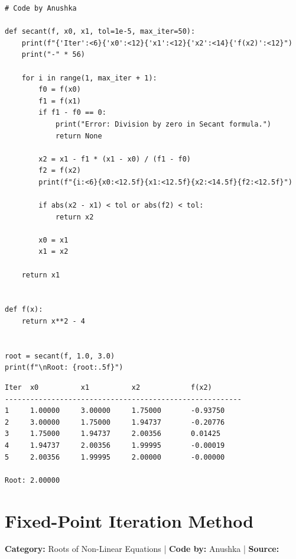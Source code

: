 \documentclass[10pt,a4paper]{report}
\begin{document}
\begin{tcolorbox}[colback=codebg,colframe=secondary,title=\textbf{Python Implementation (Step-by-Step Loops \& Pure Functions)},boxrule=1pt,arc=2mm]
\begin{lstlisting}[style=python_detailed]
# Code by Anushka

def secant(f, x0, x1, tol=1e-5, max_iter=50):
    print(f"{'Iter':<6}{'x0':<12}{'x1':<12}{'x2':<14}{'f(x2)':<12}")
    print("-" * 56)

    for i in range(1, max_iter + 1):
        f0 = f(x0)
        f1 = f(x1)
        if f1 - f0 == 0:
            print("Error: Division by zero in Secant formula.")
            return None

        x2 = x1 - f1 * (x1 - x0) / (f1 - f0)
        f2 = f(x2)
        print(f"{i:<6}{x0:<12.5f}{x1:<12.5f}{x2:<14.5f}{f2:<12.5f}")

        if abs(x2 - x1) < tol or abs(f2) < tol:
            return x2

        x0 = x1
        x1 = x2

    return x1


def f(x):
    return x**2 - 4


root = secant(f, 1.0, 3.0)
print(f"\nRoot: {root:.5f}")

\end{lstlisting}
\end{tcolorbox}

\begin{tcolorbox}[colback=termbg,colframe=primary,title=\textbf{Program Execution Output \& Convergence Table},boxrule=1pt,arc=2mm]
\begin{lstlisting}[style=terminal_output]
Iter  x0          x1          x2            f(x2)       
--------------------------------------------------------
1     1.00000     3.00000     1.75000       -0.93750    
2     3.00000     1.75000     1.94737       -0.20776    
3     1.75000     1.94737     2.00356       0.01425     
4     1.94737     2.00356     1.99995       -0.00019    
5     2.00356     1.99995     2.00000       -0.00000    

Root: 2.00000
\end{lstlisting}
\end{tcolorbox}

\newpage

\section{Fixed-Point Iteration Method}
\textbf{Category:} \textcolor{secondary}{Roots of Non-Linear Equations} \quad | \quad \textbf{Code by:} \textcolor{secondary}{Anushka} \quad | \quad \textbf{Source:} \texttt{}
\end{document}
